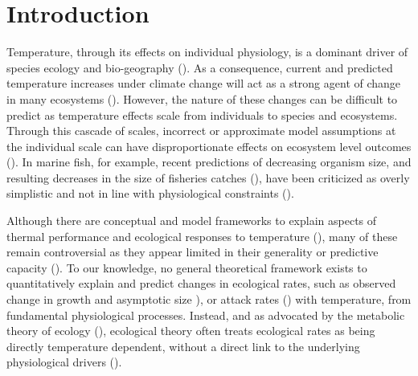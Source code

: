 \documentclass[11pt]{article}\usepackage[]{graphicx}\usepackage[]{color}
\begin{document}
\newpage

\section*{Introduction}

Temperature, through its effects on individual physiology, is a dominant driver of species ecology and bio-geography (\cite{deutsch_climate_2015,pinsky_marine_2013}). As a consequence, current and predicted temperature increases under climate change will act as a strong agent of change in many ecosystems (\cite{deutsch_climate_2015, stuart-smith_thermal_2015, parmesan_globally_2003, walther_ecological_2002}). However, the nature of these changes can be difficult to predict as temperature effects scale from individuals to species and ecosystems. Through this cascade of scales, incorrect or approximate model assumptions at the individual scale can have disproportionate effects on ecosystem level outcomes (\cite{brander_overconfidence_2013, lefevre_models_2017}). In marine fish, for example, recent predictions of decreasing organism size, and resulting decreases in the size of fisheries catches (\cite{cheung_shrinking_2013}), have been criticized as overly simplistic and not in line with physiological constraints (\cite{brander_overconfidence_2013, lefevre_models_2017,jutfelt_oxygen-and_2018}).

Although there are conceptual and model frameworks to explain aspects of thermal performance and ecological responses to temperature (\cite{fry_effects_1947,brown_toward_2004,pauly_sound_2017,portner_oxygen-and_2010}), many of these remain controversial as they appear limited in their generality or predictive capacity (\cite{lefevre_models_2017,jutfelt_oxygen-and_2018}). To our knowledge, no general theoretical framework exists to quantitatively explain and predict changes in  ecological rates, such as observed change in growth and asymptotic size \cite[e.g., the temerature-size rule in ectotherms;][]{angilletta_temperature_2004,atkinson_temperature_1994}), or attack rates (\cite{englund_temperature_2011,rall_universal_2012}) with temperature, from fundamental physiological processes. Instead, and as advocated by the metabolic theory of ecology (\cite{brown_toward_2004}), ecological theory often treats ecological rates as being directly temperature dependent, without a direct link to the underlying physiological drivers (\cite[e.g., ][]{angilletta_temperature_2004,vucic-pestic_warming_2011, guiet_effects_2016}). 
\end{document}
